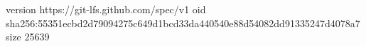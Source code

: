 version https://git-lfs.github.com/spec/v1
oid sha256:55351ecbd2d79094275c649d1bcd33da440540e88d54082dd91335247d4078a7
size 25639
